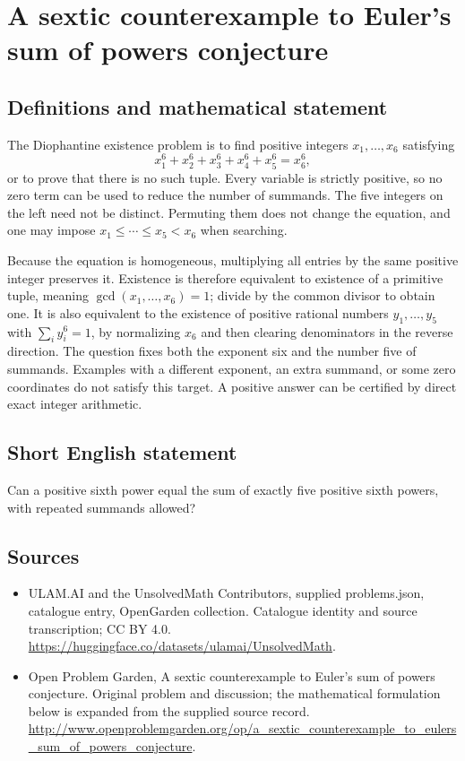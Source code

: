 \documentclass[11pt,a4paper]{article}
\begin{document}
\section*{A sextic counterexample to Euler's sum of powers conjecture}\label{statement}

\subsection{Definitions and mathematical statement}
The Diophantine existence problem is to find positive integers
$x_1,\ldots,x_6$ satisfying
\[
             x_1^6+x_2^6+x_3^6+x_4^6+x_5^6=x_6^6,
\]
or to prove that there is no such tuple. Every variable is strictly
positive, so no zero term can be used to reduce the number of summands.
The five integers on the left need not be distinct. Permuting them
does not change the equation, and one may impose
$x_1\le\cdots\le x_5<x_6$ when searching.

Because the equation is homogeneous, multiplying all entries by the
same positive integer preserves it. Existence is therefore equivalent
to existence of a primitive tuple, meaning
$\gcd(x_1,\ldots,x_6)=1$; divide by the common divisor to obtain one.
It is also equivalent to the existence of positive rational numbers
$y_1,\ldots,y_5$ with $\sum_i y_i^6=1$, by normalizing $x_6$ and
then clearing denominators in the reverse direction.
The question fixes both the exponent six and the number five of
summands. Examples with a different exponent, an extra summand,
or some zero coordinates do not satisfy this target. A positive
answer can be certified by direct exact integer arithmetic.
\subsection{Short English statement}
Can a positive sixth power equal the sum of exactly five positive sixth powers, with repeated summands allowed?
\subsection{Sources}
\begin{itemize}
\item[S1] ULAM.AI and the UnsolvedMath Contributors, supplied problems.json, catalogue entry, OpenGarden collection. Catalogue identity and source transcription; CC BY 4.0.
\url{https://huggingface.co/datasets/ulamai/UnsolvedMath}.
\item[S2] Open Problem Garden, A sextic counterexample to Euler's sum of powers conjecture. Original problem and discussion; the mathematical formulation below is expanded from the supplied source record.
\url{http://www.openproblemgarden.org/op/a_sextic_counterexample_to_eulers_sum_of_powers_conjecture}.
\end{itemize}
\end{document}
